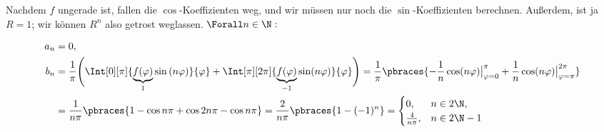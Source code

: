 \begin{solution}
\begin{enumerate}[label = (\roman*)]
    Nachdem $f$ ungerade ist, fallen die $\cos$-Koeffizienten weg, und wir müssen nur noch die $\sin$-Koeffizienten berechnen.
    Außerdem, ist ja $R = 1$; wir können $R^n$ also getrost weglassen.
    $\Forall n \in \N:$

    \begin{align*}
        a_n & = 0, \\
        b_n
        & =
        \frac{1}{\pi}
        \Bigg (
            \Int[0][\pi]
            {
                \underbrace{f(\varphi)}_1
                \sin{(n \varphi)}
            }{\varphi}
            +
            \Int[\pi][2 \pi]
            {
                \underbrace{f(\varphi)}_{-1}
                \sin(n \varphi)
            }{\varphi}
        \Bigg )
        =
        \frac{1}{\pi}
        \pbraces
        {
            -\frac{1}{n}
            \cos(n \varphi)
            \big |_{\varphi = 0}^\pi
            +
            \frac{1}{n}
            \cos(n \varphi)
            \big |_{\varphi = \pi}^{2 \pi}
        } \\
        & =
        \frac{1}{n \pi}
        \pbraces
        {
            1 - \cos{n \pi}
            +
            \cos{2n \pi} - \cos{n \pi}
        }
        =
        \frac{2}{n \pi}
        \pbraces
        {
            1 - (-1)^n
        }
        =
        \begin{cases}
            0,               & n \in 2 \N, \\
            \frac{4}{n \pi}, & n \in 2 \N - 1
        \end{cases}
    \end{align*}

\end{enumerate}



\end{solution}

